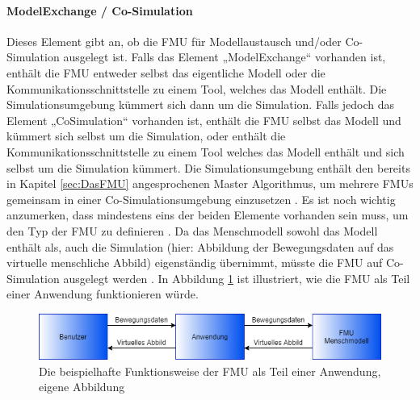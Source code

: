 \paragraph{ModelExchange / Co-Simulation}\label{sec:ModellExchangeCoSimulation}
\noindent Dieses Element gibt an, ob die FMU für Modellaustausch und/oder Co-Simulation ausgelegt ist.
Falls das Element „ModelExchange“ vorhanden ist, enthält die FMU entweder selbst das eigentliche Modell oder die Kommunikationsschnittstelle zu einem Tool, welches das Modell enthält. Die Simulationsumgebung kümmert sich dann um die Simulation.
Falls jedoch das Element „CoSimulation“ vorhanden ist, enthält die FMU selbst das Modell und kümmert sich selbst um die Simulation, oder enthält die Kommunikationsschnittstelle zu einem Tool welches das Modell enthält und sich selbst um die Simulation kümmert. Die Simulationsumgebung enthält den bereits in Kapitel \ref*{sec:DasFMU} angesprochenen Master Algorithmus, um mehrere FMUs gemeinsam in einer Co-Simulationsumgebung einzusetzen \cite[S.30]{25}.
Es ist noch wichtig anzumerken, dass mindestens eins der beiden Elemente vorhanden sein muss, um den Typ der FMU zu definieren \cite[S.31]{25}.
Da das Menschmodell sowohl das Modell enthält als, auch die Simulation (hier: Abbildung der Bewegungsdaten auf das virtuelle menschliche Abbild) eigenständig übernimmt, müsste die FMU auf Co-Simulation ausgelegt werden \cite[S.30]{25}.
\newline
In Abbildung \ref{fig:FMUCoSimulation} ist illustriert, wie die FMU als Teil einer Anwendung funktionieren würde.
\begin{figure}[h]
	\centering
	\includegraphics[width=1\linewidth]{Bilder/A23_FMUCoSimulation}
	\caption{Die beispielhafte Funktionsweise der FMU als Teil einer Anwendung, eigene Abbildung}
	\label{fig:FMUCoSimulation}
\end{figure}

